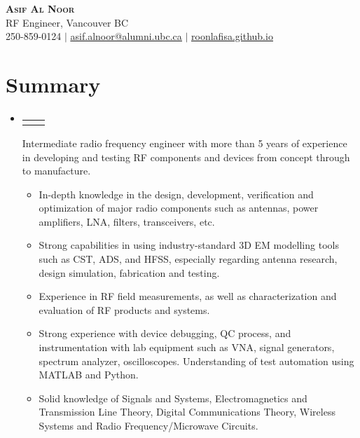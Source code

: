 \documentclass[letterpaper,11pt]{article}
\makeatletter
\newcommand{\resumeItem}[1]{
  \item\small{
    {#1 \vspace{-2pt}}
  }
}
\newcommand{\resumeProjectHeading}[2]{
    \item
    \begin{tabular*}{0.97\textwidth}{l@{\extracolsep{\fill}}r}
      \small#1 & #2 \\
    \end{tabular*}\vspace{-7pt}
}
\newcommand{\resumeSubHeadingListStart}{\begin{itemize}[leftmargin=0.15in, label={}]}
\newcommand{\resumeSubHeadingListEnd}{\end{itemize}}
\newcommand{\resumeItemListStart}{\begin{itemize}}
\newcommand{\resumeItemListEnd}{\end{itemize}\vspace{-5pt}}
\makeatother
\begin{document}


\begin{center}
    \textbf{\Huge \scshape Asif Al Noor} \\ \vspace{1pt}
     \small RF Engineer, Vancouver BC \\
    \small 250-859-0124 $|$ \href{mailto:asif.alnoor@alumni.ubc.ca}{\underline{asif.alnoor@alumni.ubc.ca}} $|$ 
    \href{https://roonlafisa.github.io/}{\underline{roonlafisa.github.io}}
\end{center}

\section{Summary}

\resumeSubHeadingListStart
    \resumeProjectHeading {}{}
    Intermediate radio frequency engineer with more than 5 years of experience in developing and testing RF components and devices from concept through to manufacture.
        \resumeItemListStart
        \resumeItem{In-depth knowledge in the design, development, verification and optimization of major radio components such as antennas, power amplifiers, LNA, filters, transceivers, etc.}
        \resumeItem{Strong capabilities in using industry-standard 3D EM modelling tools such as CST, ADS, and HFSS, especially regarding antenna research, design simulation, fabrication and testing.}
        \resumeItem{Experience in RF field measurements, as well as characterization and evaluation of RF products and systems.}
        \resumeItem{Strong experience with device debugging, QC process, and instrumentation with lab equipment such as VNA, signal generators, spectrum analyzer, oscilloscopes. Understanding of test automation using MATLAB and Python.}
        \resumeItem{Solid knowledge of Signals and Systems, Electromagnetics and Transmission Line Theory, Digital Communications Theory, Wireless Systems and Radio Frequency/Microwave Circuits.}
        \resumeItemListEnd
\resumeSubHeadingListEnd
\end{document}
